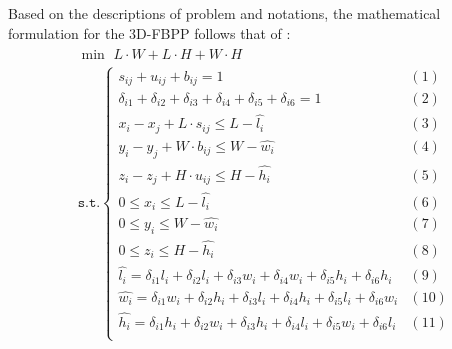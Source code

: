 Based on the descriptions of problem and notations, the mathematical formulation for the 3D-FBPP follows that of \cite{hifi2010linear}:
\begin{eqnarray*}
	\begin{split}
		&\min\,\,  L \cdot W + L \cdot H + W \cdot H\\ 
		&\texttt{s}.\texttt{t}.
		\begin{cases}
			s_{ij}+ u_{ij} + b_{ij}  =1          &(1)  \\ %
			{\delta}_{i1} + {\delta}_{i2} + {\delta}_{i3} + {\delta}_{i4} + {\delta}_{i5} + {\delta}_{i6} =1  & (2)   \\ 
			x_i - x_j + L  \cdot  s_{ij}  \le  L - \hat{l_i}                           & (3)  \\ %
			y_i - y_j + W \cdot b_{ij} \le W - \hat{w_i}                        & (4)   \\ %
			z_i - z_j + H \cdot u_{ij} \le  H - \hat{h_i}                                                                                   & (5)    \\ %
			0 \le x_i \le L- \hat{l_i}                                     & (6)\\ %
			0 \le y_i \le W - \hat{w_i}                                 & (7)\\ %
			0 \le z_i \le H - \hat{h_i}                                   & (8)\\ %
			\hat{l_i} = {\delta}_{i1}   l_i + {\delta}_{i2}  l_i + {\delta}_{i3}  w_i + {\delta}_{i4}  w_i + {\delta}_{i5}  h_i + {\delta}_{i6}  h_i& (9)\\   %
			\hat{w_i} = {\delta}_{i1}  w_i +{\delta}_{i2}  h_i +{\delta}_{i3}  l_i +{\delta}_{i4}  h_i +{\delta}_{i5}  l_i +{\delta}_{i6}  w_i& (10)\\ %
			\hat{h_i} =  {\delta}_{i1}  h_i +{\delta}_{i2}  w_i +{\delta}_{i3}  h_i +{\delta}_{i4}  l_i + {\delta}_{i5}  w_i +{\delta}_{i6}  l_i& (11)\\%

\end{cases}
\end{split}
\end{eqnarray*}
